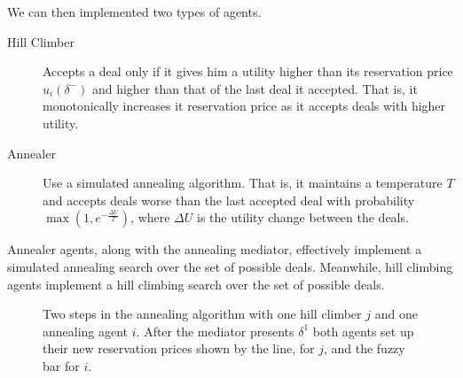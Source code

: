 We can then implemented two types of agents.
\begin{description}
\item[Hill Climber] Accepts a deal only if it gives him a utility
  higher than its reservation price $u_i(\delta^-)$ and higher than
  that of the last deal it accepted. That is, it monotonically
  increases it reservation price as it accepts deals with higher
  utility.
\item[Annealer] Use a simulated annealing algorithm. That is, it
  maintains a temperature $T$ and accepts deals worse than the last
  accepted deal with probability $\max(1,e^{-\frac{\Delta U}{T}})$,
  where $\Delta U$ is the utility change between the deals.
\end{description}

Annealer agents, along with the annealing mediator, effectively
implement a simulated annealing search over the set of possible deals.
Meanwhile, hill climbing agents implement a hill climbing search over
the set of possible deals.

\begin{SCfigure}
  \begin{minipage}{1.0\linewidth}
\begin{center}
\end{center}
  \end{minipage}
  \caption{Two steps in the annealing algorithm with one hill climber
    $j$ and one annealing agent $i$. After the mediator presents
    $\delta^1$ both agents set up their new reservation prices shown
    by the line, for $j$, and the fuzzy bar for $i$. }
  \label{fig:annealing}
\end{SCfigure}

